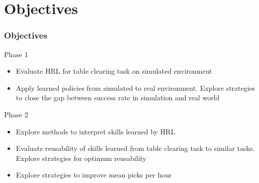 \documentclass{beamer}
\begin{document}
	\section{Objectives}
	
	\begin{frame}
		\frametitle{Objectives}
		\begin{block}{Phase 1}
			\begin{itemize}
				\item Evaluate HRL for table clearing task on simulated environment
				\item Apply learned policies from simulated to real environment. Explore strategies to close the gap between success rate in simulation and real world
			\end{itemize}
		\end{block}
		
		\begin{block}{Phase 2}
			\begin{itemize}
				\item Explore methods to interpret skills learned by HRL
				\item Evaluate reusability of skills learned from table clearing task to similar tasks. Explore strategies for optimum reusability
				\item Explore strategies to improve mean picks per hour
			\end{itemize}
		\end{block}
	\end{frame}
\end{document}
